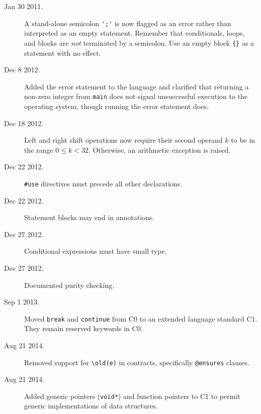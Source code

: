 \documentclass[11pt]{article}
\begin{document}
\begin{description}
\item[Jan 30 2011.] A stand-alone semicolon \verb"';'" is
  now flagged as an error rather than interpreted as an empty
  statement.  Remember that conditionals, loops, and blocks are
  \emph{not} terminated by a semicolon.  Use an empty block \verb'{}'
  as a statement with no effect.
\item[Dec 8 2012.] Added the error statement to the language and
  clarified that returning a non-zero integer from \verb'main' does
  not signal unsuccessful execution to the operating system, though
  running the error statement does.
\item[Dec 18 2012.] Left and right shift operations now require their
  second operand $k$ to be in the range $0 \leq k < 32$.  Otherwise,
  an arithmetic exception is raised.
\item[Dec 22 2012.] \verb'#use' directives must precede all other
  declarations.
\item[Dec 22 2012.] Statement blocks may end in annotations.
\item[Dec 27 2012.] Conditional expressions must have small type.
\item[Dec 27 2012.] Documented purity checking.
\item[Sep 1 2013.] Moved \verb'break' and \verb'continue' from
  C0 to an extended language standard C1.  They remain reserved
  keywords in C0.
\item[Aug 21 2014.] Removed support for \verb'\old(e)' in contracts,
  specifically \verb'@ensures' clauses.
\item[Aug 21 2014.] Added generic pointers (\verb'void*') and function
  pointers to C1 to permit generic implementations of data structures.
\end{description}
\end{document}
